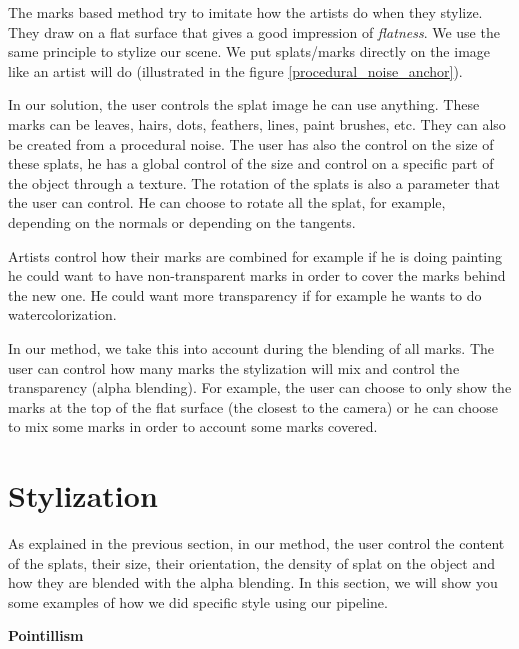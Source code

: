 The marks based method try to imitate how the artists do when they stylize. They draw on a flat surface that gives a good impression of \textit{flatness}. We use the same principle to stylize our scene. We put splats/marks directly on the image like an artist will do (illustrated in the figure \ref{procedural_noise_anchor}). \newline

In our solution, the user controls the splat image he can use anything. These marks can be leaves, hairs, dots, feathers, lines, paint brushes, etc. They can also be created from a procedural noise. The user has also the control on the size of these splats, he has a global control of the size and control on a specific part of the object through a texture. The rotation of the splats is also a parameter that the user can control. He can choose to rotate all the splat, for example, depending on the normals or depending on the tangents. \newline

Artists control how their marks are combined for example if he is doing painting he could want to have non-transparent marks in order to cover the marks behind the new one. He could want more transparency if for example he wants to do watercolorization.\newline

In our method, we take this into account during the blending of all marks. The user can control how many marks the stylization will mix and control the transparency (alpha blending). For example, the user can choose to only show the marks at the top of the flat surface (the closest to the camera) or he can choose to mix some marks in order to account some marks covered.


\section{Stylization}

As explained in the previous section, in our method, the user control the content of the splats, their size, their orientation, the density of splat on the object and how they are blended with the alpha blending. In this section, we will show you some examples of how we did specific style using our pipeline. \newline

\textbf{Pointillism}

